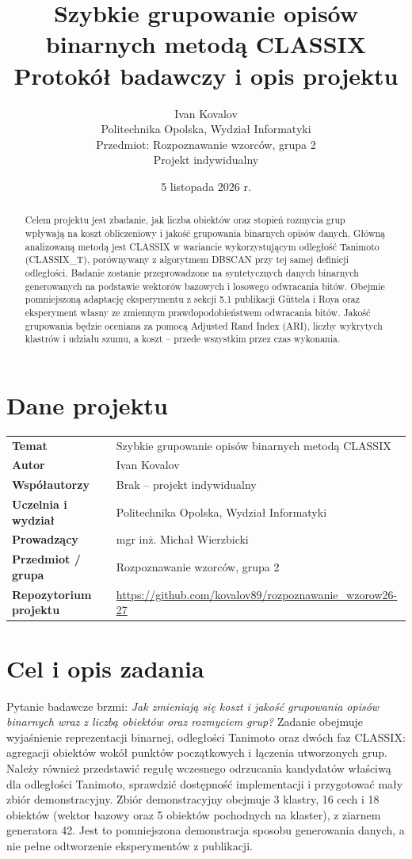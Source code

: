 \documentclass[10pt]{article}
\title{Szybkie grupowanie opisów binarnych metodą CLASSIX\\
\large Protokół badawczy i opis projektu}
\author{Ivan Kovalov\\
Politechnika Opolska, Wydział Informatyki\\
Przedmiot: Rozpoznawanie wzorców, grupa 2\\
Projekt indywidualny}
\date{5 listopada 2026 r.}
\begin{document}
\maketitle

\begin{abstract}
Celem projektu jest zbadanie, jak liczba obiektów oraz stopień rozmycia grup wpływają na koszt obliczeniowy i jakość grupowania binarnych opisów danych. Główną analizowaną metodą jest CLASSIX w wariancie wykorzystującym odległość Tanimoto (CLASSIX\_T), porównywany z algorytmem DBSCAN przy tej samej definicji odległości. Badanie zostanie przeprowadzone na syntetycznych danych binarnych generowanych na podstawie wektorów bazowych i losowego odwracania bitów. Obejmie pomniejszoną adaptację eksperymentu z sekcji 5.1 publikacji Güttela i Roya oraz eksperyment własny ze zmiennym prawdopodobieństwem odwracania bitów. Jakość grupowania będzie oceniana za pomocą Adjusted Rand Index (ARI), liczby wykrytych klastrów i udziału szumu, a koszt -- przede wszystkim przez czas wykonania.
\end{abstract}

\section{Dane projektu}
\begin{singlespace}
\begin{tabular}{>{\bfseries}p{}p{}}
Temat & Szybkie grupowanie opisów binarnych metodą CLASSIX \\
Autor & Ivan Kovalov \\
Współautorzy & Brak -- projekt indywidualny \\
Uczelnia i wydział & Politechnika Opolska, Wydział Informatyki \\
Prowadzący & mgr inż. Michał Wierzbicki \\
Przedmiot / grupa & Rozpoznawanie wzorców, grupa 2 \\
Repozytorium projektu & \url{https://github.com/kovalov89/rozpoznawanie_wzorow26-27} \\
\end{tabular}
\end{singlespace}

\section{Cel i opis zadania}
Pytanie badawcze brzmi: \emph{Jak zmieniają się koszt i jakość grupowania opisów binarnych wraz z liczbą obiektów oraz rozmyciem grup?} Zadanie obejmuje wyjaśnienie reprezentacji binarnej, odległości Tanimoto oraz dwóch faz CLASSIX: agregacji obiektów wokół punktów początkowych i łączenia utworzonych grup. Należy również przedstawić regułę wczesnego odrzucania kandydatów właściwą dla odległości Tanimoto, sprawdzić dostępność implementacji i przygotować mały zbiór demonstracyjny. Zbiór demonstracyjny obejmuje 3 klastry, 16 cech i 18 obiektów (wektor bazowy oraz 5 obiektów pochodnych na klaster), z ziarnem generatora 42. Jest to pomniejszona demonstracja sposobu generowania danych, a nie pełne odtworzenie eksperymentów z publikacji.
\end{document}

